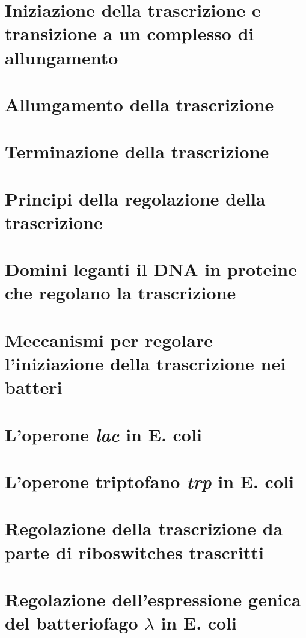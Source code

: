 \section{Iniziazione della trascrizione e transizione a un complesso di allungamento}

\section{Allungamento della trascrizione}

\section{Terminazione della trascrizione}

\section{Principi della regolazione della trascrizione}

\section{Domini leganti il DNA in proteine che regolano la trascrizione}

\section{Meccanismi per regolare l'iniziazione della trascrizione nei batteri}

\section{L'operone \emph{lac} in E. coli}

\section{L'operone triptofano \emph{trp} in E. coli}

\section{Regolazione della trascrizione da parte di riboswitches trascritti}

\section{Regolazione dell'espressione genica del batteriofago $\lambda$ in E. coli}

